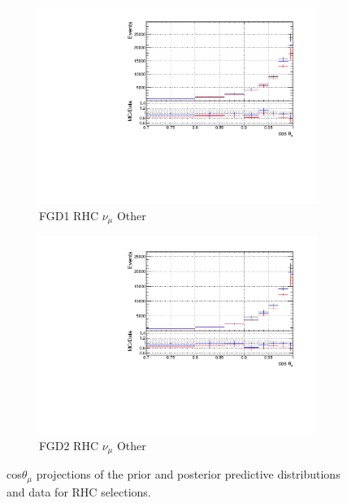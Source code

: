 \begin{figure}[!htbp]
\begin{subfigure}{0.49\textwidth}
  \centering
  \includegraphics[width=\textwidth]{figs/priorpred1D_t_FGD1_NuMuBkg_CCOther_in_AntiNu_Mode}
  \caption{FGD1 RHC $\nu_{\mu}$ Other}
\end{subfigure}
\begin{subfigure}{0.49\textwidth}
  \centering
  \includegraphics[width=\textwidth]{figs/priorpred1D_t_FGD2_NuMuBkg_CCOther_in_AntiNu_Mode}
  \caption{FGD2 RHC $\nu_{\mu}$ Other}
\end{subfigure}
\caption{cos$\theta_{\mu}$ projections of the prior and posterior predictive distributions and data for RHC \numu selections.}
\label{fig:priorpost_rhc_numu_t}
\end{figure}

